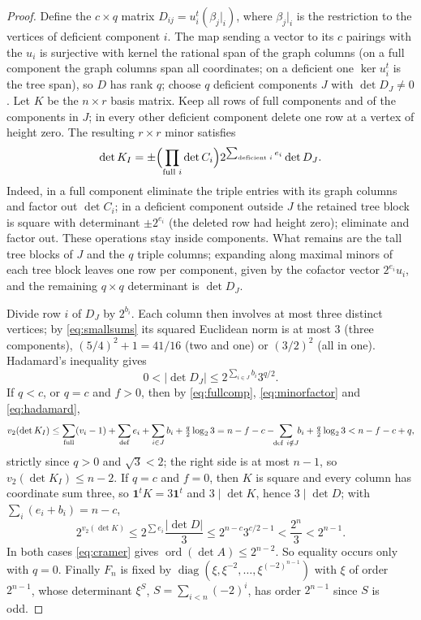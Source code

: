 \documentclass[11pt,a4paper]{article}
\theoremstyle{definition}
\newcommand{\one}{\mathbf{1}}
\newcommand{\ord}{\operatorname{ord}}
\newcommand{\diag}{\operatorname{diag}}
\begin{document}
\begin{proof}
Define the $c\times q$ matrix $D_{ij}=u_i^t(\beta_j|_i)$, where $\beta_j|_i$ is
the restriction to the vertices of deficient component $i$. The map sending a
vector to its $c$ pairings with the $u_i$ is surjective with kernel the
rational span of the graph columns (on a full component the graph columns span
all coordinates; on a deficient one $\ker u_i^t$ is the tree span), so $D$ has
rank $q$; choose $q$ deficient components $J$ with $\det D_J\ne0$. Let $K$ be
the $n\times r$ basis matrix. Keep all rows of full components and of the
components in $J$; in every other deficient component delete one row at a
vertex of height zero. The resulting $r\times r$ minor satisfies
\begin{equation}\label{eq:minorfactor}
 \det K_I=\pm\Bigl(\prod_{\text{full }i}\det C_i\Bigr)
 2^{\sum_{\text{deficient }i}e_i}\det D_J .
\end{equation}
Indeed, in a full component eliminate the triple entries with its graph
columns and factor out $\det C_i$; in a deficient component outside $J$ the
retained tree block is square with determinant $\pm2^{e_i}$ (the deleted row
had height zero); eliminate and factor out. These operations stay inside
components. What remains are the tall tree blocks of $J$ and the $q$ triple
columns; expanding along maximal minors of each tree block leaves one row per
component, given by the cofactor vector $2^{e_i}u_i$, and the remaining
$q\times q$ determinant is $\det D_J$.

Divide row $i$ of $D_J$ by $2^{b_i}$. Each column then involves at most three
distinct vertices; by \eqref{eq:smallsums} its squared Euclidean norm is at
most $3$ (three components), $(5/4)^2+1=41/16$ (two and one) or $(3/2)^2$ (all
in one). Hadamard's inequality gives
\begin{equation}\label{eq:hadamard}
 0<|\det D_J|\le2^{\sum_{i\in J}b_i}3^{q/2} .
\end{equation}
If $q<c$, or $q=c$ and $f>0$, then by \eqref{eq:fullcomp},
\eqref{eq:minorfactor} and \eqref{eq:hadamard},
\[
 v_2(\det K_I)\le\sum_{\rm full}(v_i-1)+\sum_{\rm def}e_i+\sum_{i\in J}b_i
 +\tfrac q2\log_23
 =n-f-c-\!\!\sum_{\substack{{\rm def}\ i\notin J}}\!\!b_i+\tfrac q2\log_23<n-f-c+q,
\]
strictly since $q>0$ and $\sqrt3<2$; the right side is at most $n-1$, so
$v_2(\det K_I)\le n-2$. If $q=c$ and $f=0$, then $K$ is square and every
column has coordinate sum three, so $\one^tK=3\one^t$ and $3\mid\det K$, hence
$3\mid\det D$; with $\sum_i(e_i+b_i)=n-c$,
\[
 2^{v_2(\det K)}\le2^{\sum e_i}\frac{|\det D|}3\le2^{n-c}3^{c/2-1}<\frac{2^n}3
 <2^{n-1}.
\]
In both cases \eqref{eq:cramer} gives $\ord(\det A)\le2^{n-2}$. So equality
occurs only with $q=0$. Finally $F_n$ is fixed by
$\diag(\xi,\xi^{-2},\dots,\xi^{(-2)^{n-1}})$ with $\xi$ of order $2^{n-1}$,
whose determinant $\xi^{S}$, $S=\sum_{i<n}(-2)^i$, has order $2^{n-1}$ since
$S$ is odd.
\end{proof}
\end{document}
